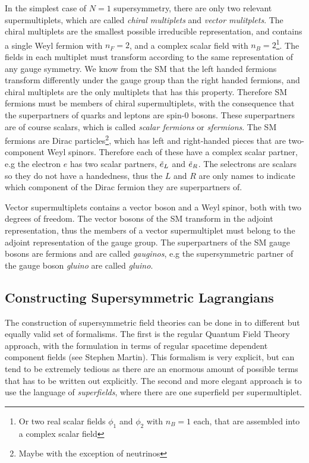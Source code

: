 In the simplest case of $N=1$ supersymmetry, there are only two relevant supermultiplets, which are called \textit{chiral multiplets} and \textit{vector mulitplets}. The chiral multiplets are the smallest possible irreducible representation, and contains a single Weyl fermion with $n_F=2$, and a complex scalar field with $n_B=2$\footnote{Or two real scalar fields $\phi_1$ and $\phi_2$ with $n_B=1$ each, that are assembled into a complex scalar field}. The fields in each multiplet must transform according to the same representation of any gauge symmetry. We know from the SM that the left handed fermions transform differently under the gauge group than the right handed fermions, and chiral multiplets are the only multiplets that has this property. Therefore SM fermions must be members of chiral supermultiplets, with the consequence that the superpartners of quarks and leptons are spin-0 bosons. These superpartners are of course scalars, which is called \textit{scalar fermions} or \textit{sfermions}. The SM fermions are Dirac particles\footnote{Maybe with the exception of neutrinos}, which has left and right-handed pieces that are two-component Weyl spinors. Therefore each of these have a complex scalar partner, e.g the electron $e$ has two scalar partners, $\Tilde{e}_{L}$ and $\Tilde{e}_R$. The selectrons are scalars so they do not have a handedness, thus the $L$ and $R$ are only names to indicate which component of the Dirac fermion they are superpartners of.

Vector supermultiplets contains a vector boson and a Weyl spinor, both with two degrees of freedom. The vector bosons of the SM transform in the adjoint representation, thus the members of a vector supermultiplet must belong to the adjoint representation of the gauge group. The superpartners of the SM gauge bosons are fermions and are called \textit{gauginos}, e.g the supersymmetric partner of the gauge boson \textit{gluino} are called \textit{gluino}.


\subsection{Constructing Supersymmetric Lagrangians}
The construction of supersymmetric field theories can be done in to different but equally valid set of formalisms. The first is the regular Quantum Field Theory approach, with the formulation in terms of regular spacetime dependent component fields (see Stephen Martin). This formalism is very explicit, but can tend to be extremely tedious as there are an enormous amount of possible terms that has to be written out explicitly. The second and more elegant approach is to use the language of \textit{superfields}, where there are one superfield per supermultiplet.

